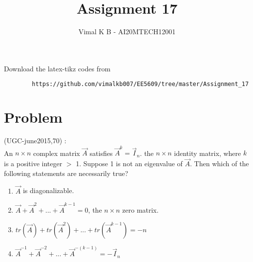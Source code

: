 \documentclass[journal,12pt]{IEEEtran}
\begin{document}
	\renewcommand{\thefigure}{\theproblem}
	\def\putbox#1#2#3{\makebox[0in][l]{\makebox[#1][l]{}\raisebox{\baselineskip}[0in][0in]{\raisebox{#2}[0in][0in]{#3}}}}
	\def\rightbox#1{\makebox[0in][r]{#1}}
	\def\centbox#1{\makebox[0in]{#1}}
	\def\topbox#1{\raisebox{-\baselineskip}[0in][0in]{#1}}
	\def\midbox#1{\raisebox{-0.5\baselineskip}[0in][0in]{#1}}
	\vspace{3cm}
	\title{Assignment 17}
	\author{Vimal K B - AI20MTECH12001}
	\maketitle
	\bigskip
	\renewcommand{\thefigure}{\theenumi}
	\renewcommand{\thetable}{\theenumi}
	Download the latex-tikz codes from 
	\begin{lstlisting}
		https://github.com/vimalkb007/EE5609/tree/master/Assignment_17
	\end{lstlisting}
	\section{\textbf{Problem}}
	(UGC-june2015,70) : \\
	An $n\times n$ complex matrix $\vec{A}$ satisfies $\vec{A}^{k} = \vec{I}_n$. the $n\times n$ identity matrix, where $k$ is a positive integer $>$ 1. Suppose 1 is not an eigenvalue of $\vec{A}$. Then which of the following statements are necessarily true?\\
	
	\begin{enumerate}
		\item $\vec{A}$ is diagonalizable. \\
		\item $\vec{A}+\Vec{A}^2+...+\vec{A}^{k-1} = 0$, the $n\times n$ zero matrix. \\
		\item $tr(\vec{A})+tr(\Vec{A}^2)+...+tr(\vec{A}^{k-1}) = -n$ \\
		\item $\vec{A}^{-1}+\Vec{A}^{-2}+...+\vec{A}^{-(k-1)} = -\vec{I}_n$
	\end{enumerate}
	
	
\end{document}
